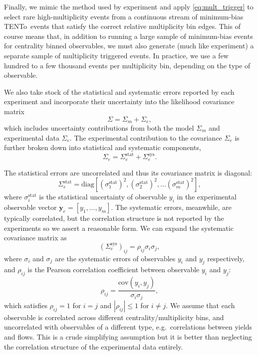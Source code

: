 \documentclass[aps,prc,reprint,amsmath,nofootinbib]{revtex4-1}
\newcommand{\trento}{T\raisebox{-0.5ex}{R}ENTo}
\newcommand{\y}{\mathbf{y}}
\begin{document}
Finally, we mimic the method used by experiment and apply \eqref{eq:mult_trigger} to select rare high-multiplicity events from a continuous stream of minimum-bias \trento\ events that satisfy the correct relative multiplicity bin edges.
This of course means that, in addition to running a large sample of minimum-bias events for centrality binned observables, we must also generate (much like experiment) a separate sample of multiplicity triggered events.
In practice, we use a few hundred to a few thousand events per multiplicity bin, depending on the type of observable.

We also take stock of the statistical and systematic errors reported by each experiment and incorporate their uncertainty into the likelihood covariance matrix
\begin{equation}
  \Sigma = \Sigma_m + \Sigma_e,
\end{equation}
which includes uncertainty contributions from both the model $\Sigma_m$ and experimental data $\Sigma_e$.
The experimental contribution to the covariance $\Sigma_e$ is further broken down into statistical and systematic components,
\begin{equation}
  \Sigma_e = \Sigma_e^\text{stat} + \Sigma_e^\text{sys}.
\end{equation}

The statistical errors are uncorrelated and thus its covariance matrix is diagonal:
\begin{equation}
  \Sigma_e^\text{stat} = \text{diag}[(\sigma^\text{stat}_1)^2, (\sigma^\text{stat}_2)^2, \dots (\sigma^\text{stat}_m)^2 ],
\end{equation}
where $\sigma^\text{stat}_i$ is the statistical uncertainty of observable $y_i$ in the experimental observable vector $\y_e = [y_1, \dots, y_m]$.
The systematic errors, meanwhile, are typically correlated, but the correlation structure is not reported by the experiments so we assert a reasonable form.
We can expand the systematic covariance matrix as
\begin{equation}
  (\Sigma_e^\text{sys})_{ij} =  \rho_{ij} \sigma_i \sigma_j,
\end{equation}
where $\sigma_i$ and $\sigma_j$ are the systematic errors of observables $y_i$ and $y_j$ respectively, and $\rho_{ij}$ is the Pearson correlation coefficient between observable $y_i$ and $y_j$:
\begin{equation}
  \rho_{ij} = \frac{\text{cov}(y_i, y_j)}{\sigma_i \sigma_j},
\end{equation}
which satisfies $\rho_{ij}=1$ for $i=j$ and $|\rho_{ij}| \le 1$ for $i \ne j$.
We assume that each observable is correlated across different centrality/multiplicity bins, and uncorrelated with observables of a different type, e.g.\ correlations between yields and flows.
This is a crude simplifying assumption but it is better than neglecting the correlation structure of the experimental data entirely.
\end{document}
